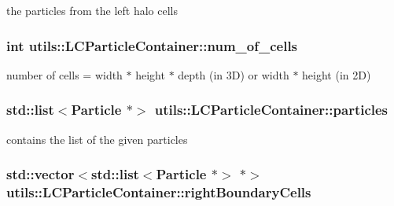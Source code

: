 the particles from the left halo cells \hypertarget{classutils_1_1LCParticleContainer_aaa76d8cdecdb35e4d115f483c328aa3c}{
\subsubsection[{num\-\_\-of\-\_\-cells}]{\setlength{\rightskip}{0pt plus 5cm}int utils\-::\-L\-C\-Particle\-Container\-::num\-\_\-of\-\_\-cells\hspace{0.3cm}{\ttfamily [private]}}}\label{classutils_1_1LCParticleContainer_aaa76d8cdecdb35e4d115f483c328aa3c}
number of cells = width $\ast$ height $\ast$ depth (in 3\-D) or width $\ast$ height (in 2\-D) \hypertarget{classutils_1_1LCParticleContainer_a4cf8fa8ce772044b98fadb8897cbc890}{
\subsubsection[{particles}]{\setlength{\rightskip}{0pt plus 5cm}std\-::list$<${\bf Particle} $\ast$$>$ utils\-::\-L\-C\-Particle\-Container\-::particles\hspace{0.3cm}{\ttfamily [private]}}}\label{classutils_1_1LCParticleContainer_a4cf8fa8ce772044b98fadb8897cbc890}
contains the list of the given particles \hypertarget{classutils_1_1LCParticleContainer_a9ddcb12f783f403327f9c45c7fc7b69f}{
\subsubsection[{right\-Boundary\-Cells}]{\setlength{\rightskip}{0pt plus 5cm}std\-::vector$<$std\-::list$<${\bf Particle} $\ast$$>$ $\ast$$>$ utils\-::\-L\-C\-Particle\-Container\-::right\-Boundary\-Cells\hspace{0.3cm}{\ttfamily [private]}}}\label{classutils_1_1LCParticleContainer_a9ddcb12f783f403327f9c45c7fc7b69f}
